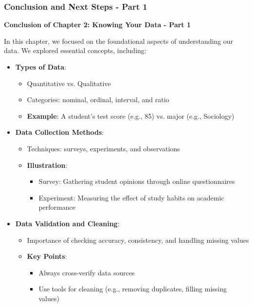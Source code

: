 \documentclass[aspectratio=169]{beamer}
\begin{document}
\begin{frame}[fragile]
    \frametitle{Conclusion and Next Steps - Part 1}
    \textbf{Conclusion of Chapter 2: Knowing Your Data - Part 1}
    
    In this chapter, we focused on the foundational aspects of understanding our data. We explored essential concepts, including:
    
    \begin{itemize}
        \item \textbf{Types of Data}:
            \begin{itemize}
                \item Quantitative vs. Qualitative
                \item Categories: nominal, ordinal, interval, and ratio
                \item \textbf{Example}: A student's test score (e.g., 85) vs. major (e.g., Sociology)
            \end{itemize}
        
        \item \textbf{Data Collection Methods}:
            \begin{itemize}
                \item Techniques: surveys, experiments, and observations
                \item \textbf{Illustration}:
                    \begin{itemize}
                        \item Survey: Gathering student opinions through online questionnaires
                        \item Experiment: Measuring the effect of study habits on academic performance
                    \end{itemize}
            \end{itemize}
        
        \item \textbf{Data Validation and Cleaning}:
            \begin{itemize}
                \item Importance of checking accuracy, consistency, and handling missing values
                \item \textbf{Key Points}:
                    \begin{itemize}
                        \item Always cross-verify data sources
                        \item Use tools for cleaning (e.g., removing duplicates, filling missing values)
                    \end{itemize}
            \end{itemize}
    \end{itemize}
\end{frame}
\end{document}
